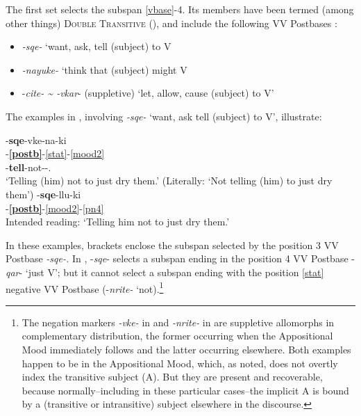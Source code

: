 \documentclass[output=paper]{langscibook}
\begin{document}
The first set selects the subspan \ref{vbase}-4. Its members have been termed (among other things) \textsc{Double} \textsc{Transitive} (\citealt{Kleinschmidt1851}), and include the following VV Postbases \citep{Woodbury2005}:

\begin{itemize}
\item 
\textit{{}-sqe-} `want, ask, tell (subject) to V
\item 
\textit{{}-nayuke-} `think that (subject) might V
\item 
{}-\textit{cite- {\textasciitilde} -vkar}{}- (suppletive) `let, allow, cause (subject) to V'
\end{itemize}

The examples in , involving \textit{{}-sqe-} `want, ask tell (subject) to V', illustrate:

\ea\label{ex:key:35}
\ea\label{ex:key:35a}
-\textbf{sqe}{}-vke-na-ki \\
    [\ref{vbase}-\ref{asp}]-\textbf{\ref{postb}}{}-\ref{stat}-\ref{mood2}\protect\footnotemark\\
     [dry.something-just]-\textbf{tell}{}-not-\Appos-\Tpl.\Obj{}\\
\glt `Telling (him) not to just dry them.' (Literally: `Not telling (him) to just dry them')
\ex\label{ex:key:35b}
-\textbf{sqe}-llu-ki \\
    [\ref{vbase}-\ref{asp}-\ref{stat}]-\textbf{\ref{postb}}{}-\ref{mood2}-\ref{pn4}\\
\glt Intended reading: `Telling him not to just dry them.'
\z
\z


In these examples, brackets enclose the subspan selected by the position 3 VV Postbase \textit{{}-sqe-.} In , -\textit{sqe}{}- selects a subspan ending in the position 4 VV Postbase -\textit{qar}{}- `just V'; but it cannot select a subspan ending with the position \ref{stat} negative VV Postbase (-\textit{nrite-} `not).\footnote{The negation markers \textit{{}-vke-} in  and \textit{{}-nrite-} in  are suppletive allomorphs in complementary distribution, the former occurring when the Appositional Mood immediately follows and the latter occurring elsewhere. 
Both examples happen to be in the Appositional Mood, which, as noted, does not overtly index the transitive subject (A). But they are present and recoverable, because normally--including in these particular cases--the implicit A is bound by a (transitive or intransitive) subject elsewhere in the discourse.}
\end{document}
